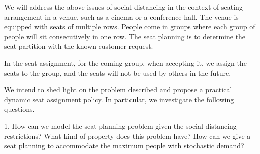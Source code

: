 


We will address the above issues of social distancing in the context of seating arrangement in a venue, such as a cinema or a conference hall. The venue is equipped with seats of multiple rows.  People come in groups where each group of people will sit consecutively in one row. 
The seat planning is to determine the seat partition with the known customer request. 


In the seat assignment, for the coming group, when accepting it, we assign the seats to the group, and the seats will not be used by others in the future.


We intend to shed light on the problem described and propose a practical dynamic seat assignment policy. In particular, we investigate the following questions. 

1. How can we model the seat planning problem given the social distancing restrictions? What kind of property does this problem have? How can we give a seat planning to accommodate the maximum people with stochastic demand?

